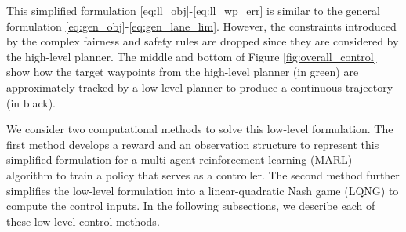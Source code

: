 This simplified formulation \eqref{eq:ll_obj}-\eqref{eq:ll_wp_err} is similar to the general formulation \eqref{eq:gen_obj}-\eqref{eq:gen_lane_lim}. However, the constraints introduced by the complex fairness and safety rules are dropped since they are considered by the high-level planner. The middle and bottom of Figure \ref{fig:overall_control} show how the target waypoints from the high-level planner (in green) are approximately tracked by a low-level planner to produce a continuous trajectory (in black). 

We consider two computational methods to solve this low-level formulation. The first method develops a reward and an observation structure to represent this simplified formulation for a multi-agent reinforcement learning (MARL) algorithm to train a policy that serves as a controller. The second method further simplifies the low-level formulation into a linear-quadratic Nash game (LQNG) to compute the control inputs. In the following subsections, we describe each of these low-level control methods.

